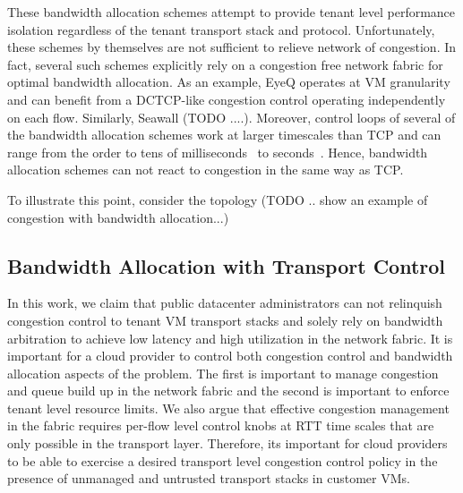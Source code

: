 These bandwidth allocation schemes attempt to provide tenant level performance isolation 
regardless of the tenant transport stack and protocol. Unfortunately, these schemes by 
themselves are not sufficient to relieve network of congestion. In fact, several such 
schemes explicitly rely on a congestion free network fabric for optimal bandwidth 
allocation. As an example, EyeQ operates at VM granularity and can benefit from a 
DCTCP-like congestion control operating independently on each 
flow. Similarly, Seawall (TODO ....). Moreover, control loops of several of the bandwidth
allocation schemes work at larger timescales than TCP and can range from the order to 
tens of milliseconds~\cite{shieh2011sharing, rodrigues2011gatekeeper} to 
seconds~\cite{Ballani2011oktopus}. Hence, bandwidth allocation schemes can not react to 
congestion in the same way as TCP.

To illustrate this point, consider the topology (TODO .. show an example of 
congestion with bandwidth allocation...)


\subsection{Bandwidth Allocation with Transport Control}
In this work, we claim that public datacenter administrators can not relinquish 
congestion control to tenant VM transport stacks and solely rely on bandwidth arbitration
to achieve low latency and high utilization in the network fabric. It is important for a 
cloud provider to control both congestion control and bandwidth allocation aspects of the 
problem. The first is important to manage congestion and queue build up in the network 
fabric and the second is important to enforce tenant level resource limits. We also 
argue that effective congestion management in the fabric requires per-flow level control 
knobs at RTT time scales that are only possible in the transport layer. Therefore, its 
important for cloud providers to be able to exercise a desired transport level congestion
control policy in the presence of unmanaged and untrusted transport stacks in customer 
VMs. 

